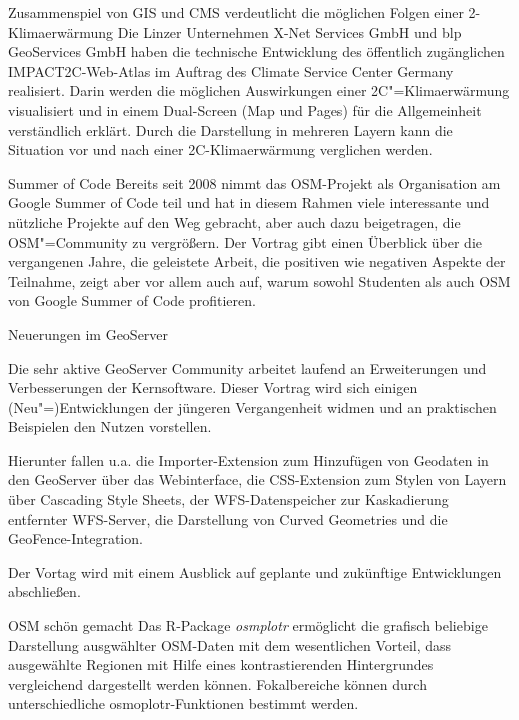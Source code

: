 \renewcommand{\konferenztag}{\mittwoch}
%
{Zusammenspiel von GIS und CMS verdeutlicht die möglichen Folgen einer 2\textdegree-Klimaerwärmung}%
{}%
{Die Linzer Unternehmen X-Net Services GmbH und blp GeoServices GmbH haben die technische Entwicklung
des öffentlich zugänglichen IMPACT2C-Web-Atlas im Auftrag des Climate Service Center Germany realisiert.
Darin werden die möglichen Auswirkungen einer 2\textdegree C"=Klimaerwärmung visualisiert und in einem Dual-Screen
(Map und Pages) für die Allgemeinheit verständlich erklärt. Durch die Darstellung in mehreren Layern
kann die Situation vor und nach einer 2\textdegree C-Klimaerwärmung verglichen werden.}

\enlargethispage{4ex}
%
{Summer of Code}%
{}%
{Bereits seit 2008 nimmt das OSM-Projekt als Organisation am Google Summer of Code teil und
hat in diesem Rahmen viele interessante und nützliche Projekte auf den Weg gebracht, aber auch dazu
beigetragen, die OSM"=Community zu vergrößern. Der Vortrag gibt einen Überblick über die
vergangenen Jahre, die geleistete Arbeit, die positiven wie negativen Aspekte der Teilnahme, zeigt
aber vor allem auch auf, warum sowohl Studenten als auch OSM von Google Summer of Code profitieren.}

%
{Neuerungen im GeoServer}%
{}%
{Die sehr aktive GeoServer Community arbeitet laufend an Erweiterungen und Verbesserungen
der Kernsoftware. Dieser Vortrag wird sich einigen (Neu"=)Entwicklungen der jüngeren
Vergangenheit widmen und an praktischen Beispielen den Nutzen vorstellen.

Hierunter fallen u.a. die Importer-Extension zum Hinzufügen von Geodaten in den GeoServer über das Webinterface,
die CSS-Extension zum Stylen von Layern über Cascading Style Sheets,
der WFS-Datenspeicher zur Kaskadierung entfernter WFS-Server,
die Darstellung von Curved Geometries und
die GeoFence-Integration.

Der Vortag wird mit einem Ausblick auf geplante und zukünftige Entwicklungen abschließen.}

%
{OSM schön gemacht}%
{}%
{Das R-Package \emph{osmplotr} ermöglicht die grafisch beliebige Darstellung ausgwählter OSM-Daten mit dem
wesentlichen Vorteil, dass ausgewählte Regionen mit Hilfe eines kontrastierenden Hintergrundes vergleichend
dargestellt werden können. Fokalbereiche können durch unterschiedliche osmoplotr-Funktionen bestimmt werden.}

